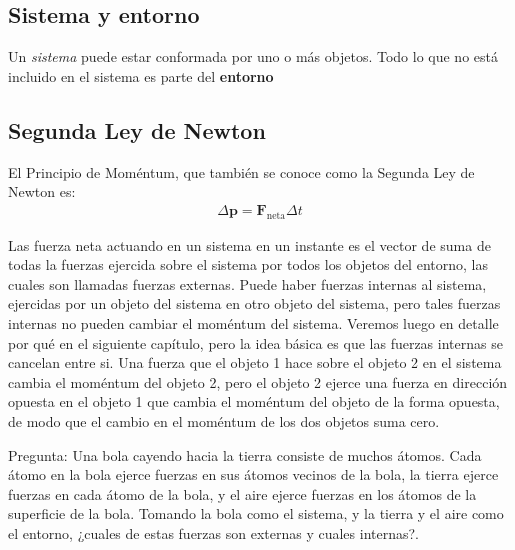 \subsection{Sistema y entorno}

Un \emph{sistema} puede estar conformada por uno o más objetos. Todo lo que no está incluido en el sistema es parte del \textbf{entorno}



\subsection{Segunda Ley de Newton}

\begin{frame}
{El Principio de Moméntum}, que también se conoce como la Segunda Ley de Newton es:
\begin{align}
  \Delta\mathbf{p}=\mathbf{F}_{\text{neta}}\Delta t
\end{align}
\end{frame}


Las fuerza neta actuando en un sistema en un instante es el vector de
suma de todas la fuerzas ejercida sobre el sistema por todos los
objetos del entorno, las cuales son llamadas fuerzas externas. Puede
haber fuerzas internas al sistema, ejercidas por un objeto del sistema
en otro objeto del sistema, pero tales fuerzas internas no pueden
cambiar el moméntum del sistema. Veremos luego en detalle por qué en
el siguiente capítulo, pero la idea básica es que las fuerzas internas
se cancelan entre si. Una fuerza que el objeto 1 hace sobre el objeto
2 en el sistema cambia el moméntum del objeto 2, pero el objeto 2
ejerce una fuerza en dirección opuesta en el objeto 1 que cambia el
moméntum del objeto de la forma opuesta, de modo que el cambio en el
moméntum de los dos objetos suma cero.




  

\begin{frame}
  \begin{block}%
{Pregunta:} Una bola cayendo hacia la tierra consiste de muchos
  átomos. Cada átomo en la bola ejerce fuerzas en sus átomos vecinos
  de la bola, la tierra ejerce fuerzas en cada átomo de la bola, y el
  aire ejerce fuerzas en los átomos de la superficie de la
  bola. Tomando la bola como el sistema, y la tierra y el aire como el
  entorno, ¿cuales de estas fuerzas son externas y cuales internas?.
    
  \end{block}

  
\end{frame}

